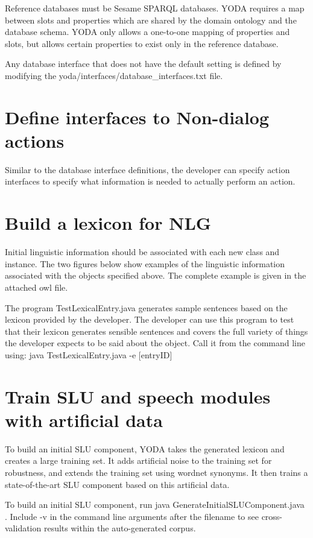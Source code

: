 \documentclass[10pt]{article}
\begin{document}
Reference databases must be Sesame SPARQL databases.
YODA requires a map between slots and properties which are shared by the domain ontology and the database schema.
YODA only allows a one-to-one mapping of properties and slots, but allows certain properties to exist only in the reference database.

Any database interface that does not have the default setting is defined by modifying the yoda/interfaces/database\_interfaces.txt file.


\section {Define interfaces to Non-dialog actions}
Similar to the database interface definitions, the developer can specify action interfaces to specify what information is needed to actually perform an action.

\section {Build a lexicon for NLG}
Initial linguistic information should be associated with each new class and instance.
The two figures below show examples of the linguistic information associated with the objects specified above.
The complete example is given in the attached owl file.

The program TestLexicalEntry.java generates sample sentences based on the lexicon provided by the developer.
The developer can use this program to test that their lexicon generates sensible sentences and covers the full variety of things the developer expects to be said about the object.
Call it from the command line using: java TestLexicalEntry.java -e [entryID]


\section {Train SLU and speech modules with artificial data}

To build an initial SLU component, YODA takes the generated lexicon and creates a large training set.
It adds artificial noise to the training set for robustness, and extends the training set using wordnet synonyms.
It then trains a state-of-the-art SLU component based on this artificial data.

To build an initial SLU component, run java GenerateInitialSLUComponent.java .
Include -v in the command line arguments after the filename to see cross-validation results within the auto-generated corpus.
\end{document}
